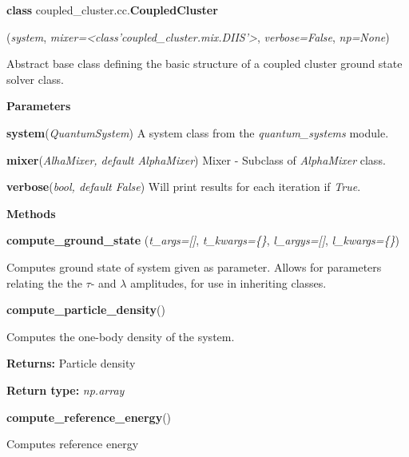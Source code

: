 \begin{tcolorbox}
    {\selectfont
    \textbf{class} coupled\_cluster.cc.\textbf{CoupledCluster}

    \hspace{1em}(\emph{system}, \emph{mixer=<class'coupled\_cluster.mix.DIIS'>}, 
        \emph{verbose=False}, \emph{np=None})

    \vspace{1em}
    Abstract base class defining the basic structure of a coupled cluster ground state 
    solver class.
    
    \vspace{1em}
    \textbf{Parameters}

    \hspace{2em}\textbf{system}(\emph{QuantumSystem}) A system class from the 
        \emph{quantum\_systems} module.

    \hspace{2em}\textbf{mixer}(\emph{AlhaMixer, default AlphaMixer}) Mixer - 
        Subclass of \emph{AlphaMixer} class.

    \hspace{2em}\textbf{verbose}(\emph{bool, default False}) Will print results 
        for each iteration if \emph{True}.

    \vspace{1em}
    \textbf{Methods}

    \hspace{2em} \textbf{compute\_ground\_state}
        (\emph{t\_args=[]}, \emph{t\_kwargs=\{\}}, \emph{l\_argys=[]}, \emph{l\_kwargs=\{\}})
        \begin{adjustwidth}{4em}{}
        Computes ground state of system given as parameter. Allows for parameters relating 
        the the $\tau$- and $\lambda$ amplitudes, for use in inheriting classes.
        \end{adjustwidth}
    
    \hspace{2em} \textbf{compute\_particle\_density}()
        \begin{adjustwidth}{4em}{}
        Computes the one-body density of the system.
   
        \textbf{Returns:} Particle density 
  
        \textbf{Return type:} \emph{np.array}
        \end{adjustwidth}
    
    \hspace{2em} \textbf{compute\_reference\_energy}()
        \begin{adjustwidth}{4em}{}
        Computes reference energy


\end{adjustwidth}}
\end{tcolorbox}
